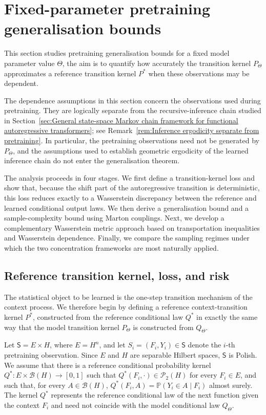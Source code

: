 \section{Fixed-parameter pretraining generalisation bounds}
\label{sec:Fixed-parameter pretraining generalisation}

This section studies pretraining generalisation bounds for a fixed model parameter value \(\Theta\), the aim is to quantify how accurately the transition kernel \(P_\Theta\) approximates a reference transition kernel \(P^*\) when these observations may be dependent.

The dependence assumptions in this section concern the observations used during pretraining. They are logically separate from the recursive-inference chain studied in Section~\ref{sec:General state-space Markov chain framework for functional autoregressive transformers}; see Remark~\ref{rem:Inference ergodicity separate from pretraining}. In particular, the pretraining observations need not be generated by \(P_\Theta\), and the assumptions used to establish geometric ergodicity of the learned inference chain do not enter the generalisation theorem.

The analysis proceeds in four stages. We first define a transition-kernel loss and show that, because the shift part of the autoregressive transition is deterministic, this loss reduces exactly to a Wasserstein discrepancy between the reference and learned conditional output laws. We then derive a generalisation bound and a sample-complexity bound using Marton couplings. Next, we develop a complementary Wasserstein metric approach based on transportation inequalities and Wasserstein dependence. Finally, we compare the sampling regimes under which the two concentration frameworks are most naturally applied.

\subsection{Reference transition kernel, loss, and risk}
\label{subsec:Reference transition kernel loss and risk}

The statistical object to be learned is the one-step transition mechanism of the context process. We therefore begin by defining a reference context-transition kernel \(P^*\), constructed from the reference conditional law \(Q^*\) in exactly the same way that the model transition kernel \(P_\Theta\) is constructed from \(Q_\Theta\).

Let \(\mathsf S=E\times H\), where \(E=H^n\), and let \(S_i=(F_i,Y_i)\in\mathsf S\) denote the \(i\)-th pretraining observation. Since \(E\) and \(H\) are separable Hilbert spaces, \(\mathsf S\) is Polish. We assume that there is a reference conditional probability kernel \(Q^*:E\times\mathcal B(H)\to[0,1]\) such that \(Q^*(F_i,\cdot)\in\mathcal P_2(H)\) for every \(F_i\in E\), and such that, for every \(A\in\mathcal B(H)\), \(Q^*(F_i,A)=\mathbb P(Y_i\in A\mid F_i)\) almost surely. The kernel \(Q^*\) represents the reference conditional law of the next function given the context \(F_i\) and need not coincide with the model conditional law \(Q_\Theta\).

